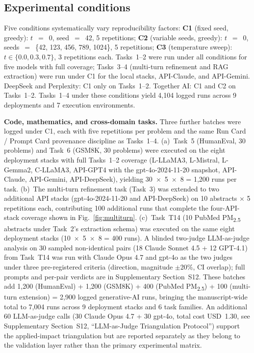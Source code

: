 \documentclass[sn-nature]{sn-jnl}
\begin{document}
\subsection{Experimental conditions}\label{subsec:conditions}

Five conditions systematically vary reproducibility factors:
\textbf{C1} (fixed seed, greedy): $t$~$=$~0, seed~$=$~42, 5 repetitions;
\textbf{C2} (variable seeds, greedy): $t$~$=$~0, seeds~$=$~\{42, 123, 456, 789, 1024\}, 5 repetitions;
\textbf{C3} (temperature sweep): $t \in \{0.0, 0.3, 0.7\}$, 3 repetitions each.
Tasks~1--2 were run under all conditions for five models with full coverage; Tasks~3--4 (multi-turn refinement and RAG extraction) were run under C1 for the local stacks, API-Claude, and API-Gemini.
DeepSeek and Perplexity: C1 only on Tasks~1--2.
Together AI: C1 and C2 on Tasks~1--2.
Tasks~1--4 under these conditions yield 4{,}104 logged runs across 9 deployments and 7 execution environments.

\textbf{Code, mathematics, and cross-domain tasks.} Three further batches were logged under C1, each with five repetitions per problem and the same Run Card / Prompt Card provenance discipline as Tasks~1--4.
(a)~Task~5 (HumanEval, 30 problems) and Task~6 (GSM8K, 30 problems) were executed on the eight deployment stacks with full Tasks~1--2 coverage (L-LLaMA3, L-Mistral, L-Gemma2, C-LLaMA3, API-GPT4 with the gpt-4o-2024-11-20 snapshot, API-Claude, API-Gemini, API-DeepSeek), yielding 30~$\times$~5~$\times$~8 = 1{,}200 runs per task.
(b)~The multi-turn refinement task (Task~3) was extended to two additional API stacks (gpt-4o-2024-11-20 and API-DeepSeek) on 10 abstracts $\times$ 5 repetitions each, contributing 100 additional runs that complete the four-API-stack coverage shown in Fig.~\ref{fig:multiturn}.
(c)~Task~T14 (10 PubMed PM\textsubscript{2.5} abstracts under Task~2's extraction schema) was executed on the same eight deployment stacks (10~$\times$~5~$\times$~8 = 400 runs).
A blinded two-judge LLM-as-judge analysis on 30 sampled non-identical pairs (18 Claude Sonnet 4.5 + 12 GPT-4.1) from Task~T14 was run with Claude Opus 4.7 and gpt-4o as the two judges under three pre-registered criteria (direction, magnitude $\pm$20\%, CI overlap); full prompts and per-pair verdicts are in Supplementary Section~S12.
These batches add 1{,}200 (HumanEval) + 1{,}200 (GSM8K) + 400 (PubMed PM\textsubscript{2.5}) + 100 (multi-turn extension) = 2{,}900 logged generative-AI runs, bringing the manuscript-wide total to 7{,}004 runs across 9 deployment stacks and 6 task families. An additional 60 LLM-as-judge calls (30 Claude Opus 4.7 + 30 gpt-4o, total cost USD~1.30, see Supplementary Section~S12, ``LLM-as-Judge Triangulation Protocol'') support the applied-impact triangulation but are reported separately as they belong to the validation layer rather than the primary experimental matrix.
\end{document}
